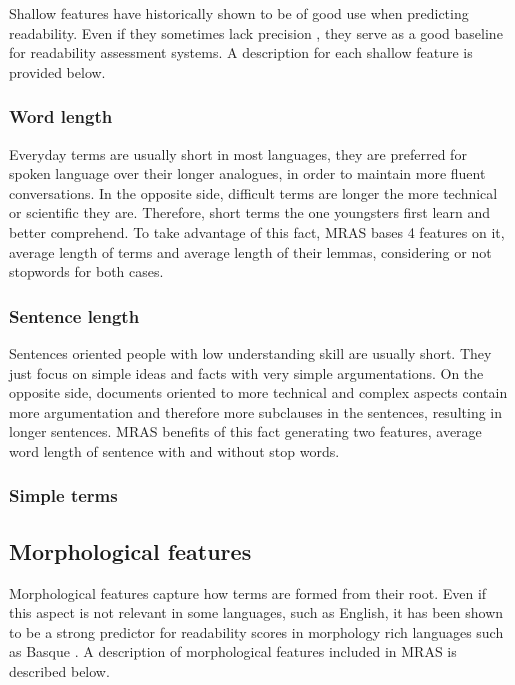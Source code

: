 \documentclass{bsu-ms}
\newcommand{\projectName}{MRAS\xspace}
\begin{document}
Shallow features \cite{flesch1948new,chall1995readability,albright1996readability} have historically shown to be of good use when predicting readability. Even if they sometimes lack precision \cite{davison1982failure}, they serve as a good baseline for readability assessment systems. A description for each shallow feature is provided below.

\subsubsection*{Word length}
Everyday terms are usually short in most languages, they are preferred for spoken language over their longer analogues, in order to maintain more fluent conversations. In the opposite side, difficult terms are longer the more technical or scientific they are. Therefore, short terms the one youngsters first learn and better comprehend. To take advantage of this fact, \projectName bases 4 features on it,  average length of terms and average length of their lemmas, considering or not stopwords for both cases.



\subsubsection*{Sentence length}
Sentences oriented people with low understanding skill are usually short. They just focus on simple ideas and facts with very simple argumentations. On the opposite side, documents oriented to more technical and complex aspects contain more argumentation and therefore more subclauses in the sentences, resulting in longer sentences. \projectName benefits of this fact generating two features, average word length of sentence with and without stop words.

\subsubsection*{Simple terms}







\subsection{Morphological features}
Morphological features capture how terms are formed from their root. Even if this  aspect is not relevant in some languages, such as English, it has been shown to be a strong predictor for readability scores in morphology rich languages such as Basque \cite{gonzalez2014simple}. A description of morphological features included in \projectName is described below.
\end{document}
